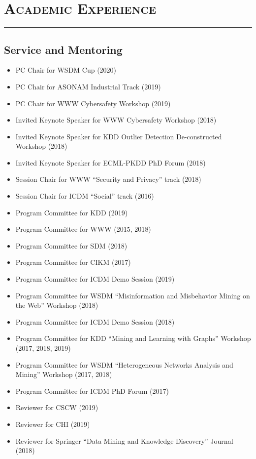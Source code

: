 \documentclass{article}
\newcommand{\HRule}{\rule{\linewidth}{0.5mm}}
\begin{document}
\section*{\bf \textsc{Academic Experience}}
\vspace{-5mm}\HRule

\subsection*{\bf {Service and Mentoring}}

\begin{itemize}
  \item PC Chair for WSDM Cup (2020)    
  \item PC Chair for ASONAM Industrial Track (2019)
  \item PC Chair for WWW Cybersafety Workshop (2019)
  \item Invited Keynote Speaker for WWW Cybersafety Workshop (2018)
  \item Invited Keynote Speaker for KDD Outlier Detection De-constructed Workshop (2018)
  \item Invited Keynote Speaker for ECML-PKDD PhD Forum (2018)
  \item Session Chair for WWW ``Security and Privacy'' track (2018)
  \item Session Chair for ICDM ``Social'' track (2016)
  \item Program Committee for KDD (2019)
  \item Program Committee for WWW (2015, 2018)
  \item Program Committee for SDM (2018)
  \item Program Committee for CIKM (2017)
  \item Program Committee for ICDM Demo Session (2019)
   \item Program Committee for WSDM ``Misinformation and Misbehavior Mining on the Web'' Workshop (2018)
    \item Program Committee for  ICDM Demo Session (2018)
   \item Program Committee for KDD ``Mining and Learning with Graphs'' Workshop (2017, 2018, 2019)
 \item Program Committee for WSDM ``Heterogeneous Networks Analysis and Mining'' Workshop (2017, 2018)
 \item Program Committee for  ICDM PhD Forum (2017)
 \item Reviewer for CSCW (2019)
 \item Reviewer for CHI (2019)
 \item Reviewer for Springer ``Data Mining and Knowledge Discovery'' Journal (2018)

\end{itemize}
\end{document}
